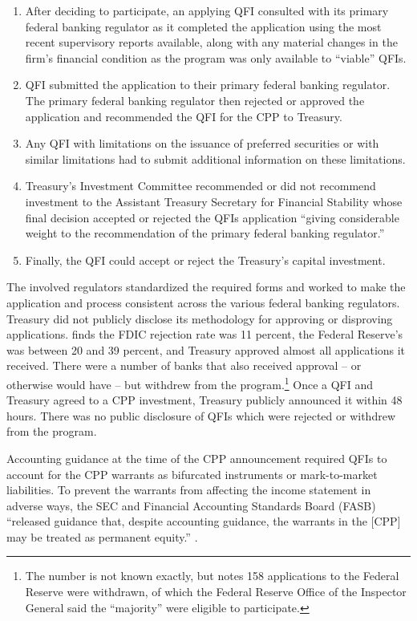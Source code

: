 \documentclass[12pt]{article}
\begin{document}
\begin{enumerate}
\item After deciding to participate, an applying QFI consulted with its primary federal banking regulator as it completed the application using the most recent supervisory reports available, along with any material changes in the firm's financial condition as the program was only available to ``viable'' QFIs.
\item QFI submitted the application to their primary federal banking regulator. The primary federal banking regulator then rejected or approved the application and recommended the QFI for the CPP to Treasury.
\item Any QFI with limitations on the issuance of preferred securities or with similar limitations had to submit additional information on these limitations.
\item Treasury's Investment Committee recommended or did not recommend investment to the Assistant Treasury Secretary for Financial Stability whose final decision accepted or rejected the QFIs application ``giving considerable weight to the recommendation of the primary federal banking regulator.''
\item Finally, the QFI could accept or reject the Treasury's capital investment.
\end{enumerate}

The involved regulators standardized the required forms and worked to make the application and process consistent across the various federal banking regulators. Treasury did not publicly disclose its methodology for approving or disproving applications. \citet{RejectionRates} finds the FDIC rejection rate was 11 percent, the Federal Reserve's was between 20 and 39 percent, and Treasury approved almost all applications it received. There were a number of banks that also received approval -- or otherwise would have -- but withdrew from the program.\footnote{The number is not known exactly, but \citet{RejectionRates} notes 158 applications to the Federal Reserve were withdrawn, of which the Federal Reserve Office of the Inspector General said the ``majority'' were eligible to participate.} Once a QFI and Treasury agreed to a CPP investment, Treasury publicly announced it within 48 hours. There was no public disclosure of QFIs which were rejected or withdrew from the program.

Accounting guidance at the time of the CPP announcement required QFIs to account for the CPP warrants as bifurcated instruments or mark-to-market liabilities. To prevent the warrants from affecting the income statement in adverse ways, the SEC and Financial Accounting Standards Board (FASB) ``released guidance that, despite accounting guidance, the warrants in the [CPP] may be treated as permanent equity.'' \citep{mofo}.
\end{document}
